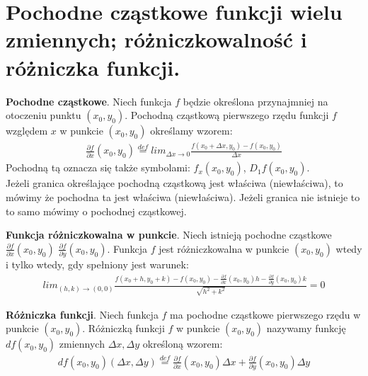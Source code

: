 \documentclass[12pt]{article}
\begin{document}
    \newpage

    \section{Pochodne cząstkowe funkcji wielu zmiennych; różniczkowalność i różniczka funkcji.}

    \begin{definition}
        \textbf{Pochodne cząstkowe}. Niech funkcja $f$ będzie określona przynajmniej na otoczeniu punktu $(x_0, y_0)$.
        Pochodną cząstkową pierwszego rzędu funkcji $f$ względem $x$ w punkcie $(x_0, y_0)$ określamy wzorem:
        \begin{align*}
            \frac{\partial f}{\partial x}(x_0, y_0)  \stackrel{def}{=} lim_{\Delta x \rightarrow 0} \frac{f(x_0 + \Delta x, y_0) - f(x_0, y_0)}{\Delta x}
        \end{align*}
        Pochodną tą oznacza się także symbolami: $f_x(x_0, y_0)$, $D_1 f(x_0, y_0)$.\\

        Jeżeli granica określające pochodną cząstkową jest właściwa (niewłaściwa), to mówimy że pochodna ta jest
        właściwa (niewłaściwa). Jeżeli granica nie istnieje to to samo mówimy o pochodnej cząstkowej.
    \end{definition}

    \begin{definition}
        \textbf{Funkcja różniczkowalna w punkcie}. Niech istnieją pochodne cząstkowe $\frac{\partial f}{\partial x}(x_0, y_0)$
        $\frac{\partial f}{\partial y}(x_0, y_0)$. Funkcja $f$ jest różniczkowalna w punkcie $(x_0, y_0)$  wtedy i tylko
        wtedy, gdy spełniony jest warunek:
        \begin{align*}
            lim_{(h, k) \rightarrow (0,0)} \frac{f(x_0 + h, y_0 + k) - f(x_0, y_0) - \frac{\partial f}{\partial x}(x_0, y_0)h - \frac{\partial f}{\partial y}(x_0, y_0)k}{\sqrt{h^2 + k^2}} = 0
        \end{align*}
    \end{definition}

    \begin{definition}
        \textbf{Różniczka funkcji}. Niech funkcja $f$ ma pochodne cząstkowe pierwszego rzędu w punkcie $(x_0, y_0)$. Różniczką
        funkcji $f$ w punkcie $(x_0, y_0)$ nazywamy funkcję $df(x_0, y_0)$ zmiennych $\Delta x, \Delta y$ określoną
        wzorem:
        \begin{align*}
            df(x_0, y_0)(\Delta x, \Delta y) \stackrel{def}{=} \frac{\partial f}{\partial x}(x_0, y_0)\Delta x + \frac{\partial f}{\partial y}(x_0, y_0)\Delta y
        \end{align*}
    \end{definition}
\end{document}
